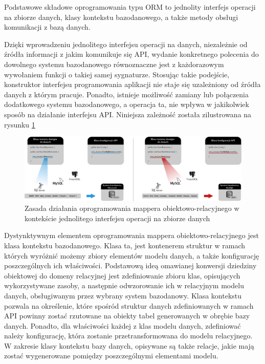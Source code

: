 Podstawowe składowe oprogramowania typu ORM to jednolity interfejs operacji na zbiorze danych, klasy kontekstu bazodanowego, a także metody obsługi komunikacji z bazą danych.

Dzięki wprowadzeniu jednolitego interfejsu operacji na danych, niezależnie od źródła informacji z jakim komunikuje się API, wydanie konkretnego polecenia do dowolnego systemu bazodanowego równoznaczne jest z każdorazowym wywołaniem funkcji o takiej samej sygnaturze. Stosując takie podejście, konstruktor interfejsu programowania aplikacji nie staje się uzależniony od źródła danych z którym pracuje. Ponadto, istnieje możliwość zamiany lub połączenia dodatkowego systemu bazodanowego, a operacja ta, nie wpływa w jakikolwiek sposób na działanie interfejsu API. Niniejsza zależność została zilustrowana na rysunku \ref{fig:orm-wyjasnienie}

\begin{figure}[ht]
 \centering
  \includegraphics[width=1\linewidth]{rys02/orm-wyjasnienie}
 \caption{Zasada działania oprogramowania mappera obiektowo-relacyjnego w kontekście jednolitego interfejsu operacji na zbiorze danych}
 \label{fig:orm-wyjasnienie}
\end{figure}

Dystynktywnym elementem oprogramowania mappera obiektowo-relacyjnego jest klasa kontekstu bazodanowego. Klasa ta, jest kontenerem struktur w ramach których wyróżnić możemy zbiory elementów modelu danych, a także konfigurację poszczególnych ich właściwości. Podstawową ideą omawianej konwersji dziedziny obiektowej do domeny relacyjnej jest zdefiniowanie zbioru klas, opisujących wykorzystywane zasoby, a następnie odwzorowanie ich w relacyjnym modelu danych, obsługiwanym przez wybrany system bazodanowy. Klasa kontekstu pozwala na określenie, które spośród struktur danych zdefiniowanych w ramach API powinny zostać rzutowane na obiekty tabel generowanych w obrębie bazy danych. Ponadto, dla właściwości każdej z klas modelu danych, zdefiniować należy konfigurację, która zostanie przetransformowana do modelu relacyjnego. W zakresie klasy kontekstu bazy danych, opisywane są także relacje, jakie mają zostać wygenerowane pomiędzy poszczególnymi elementami modelu.

